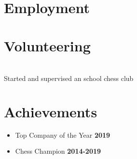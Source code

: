 \documentclass[letterpaper,11pt]{article}
\begin{document}
\section{\color{blue}Employment}
\vspace{5pt}


\section{\color{blue}Volunteering}
\vspace{5pt}
\begin{addmargin}[1em]{2em}%
\\
\vspace{5pt}
Started and supervised an school chess club
\end{addmargin}
\vspace{5pt}

\section{\color{blue}Achievements}
\vspace{5pt}

\begin{addmargin}[1em]{2em}%
\begin{itemize}
  \item Top Company of the Year \hfill  \textbf{2019}
\vspace{-6pt}
  \item Chess Champion \hfill \textbf{2014-2019}
\vspace{-6pt}
\end{itemize}
\end{addmargin}
\end{document}
